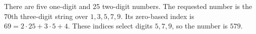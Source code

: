 There are five one-digit and 25 two-digit numbers. The requested number is the 70th three-digit string over $1,3,5,7,9$. Its zero-based index is $69=2\cdot25+3\cdot5+4$. These indices select digits $5,7,9$, so the number is $\boxed{579}$.

